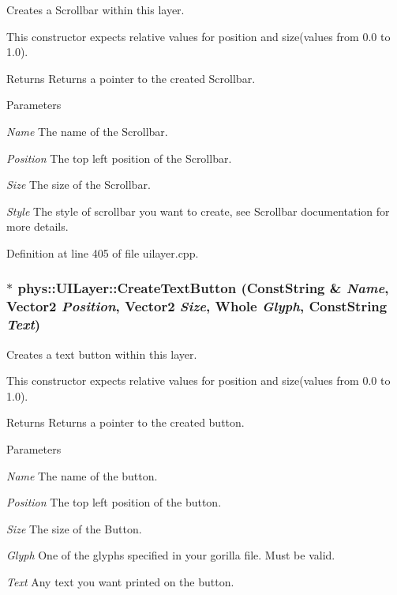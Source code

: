 Creates a Scrollbar within this layer. 

This constructor expects relative values for position and size(values from 0.0 to 1.0). \begin{DoxyReturn}{Returns}
Returns a pointer to the created Scrollbar. 
\end{DoxyReturn}

\begin{DoxyParams}{Parameters}
\item[{\em Name}]The name of the Scrollbar. \item[{\em Position}]The top left position of the Scrollbar. \item[{\em Size}]The size of the Scrollbar. \item[{\em Style}]The style of scrollbar you want to create, see Scrollbar documentation for more details. \end{DoxyParams}


Definition at line 405 of file uilayer.cpp.

\hypertarget{classphys_1_1UILayer_a734a98ef447b774cae7fd386e0624710}{
\subsubsection[{CreateTextButton}]{ $\ast$ phys::UILayer::CreateTextButton ({\bf ConstString} \& {\em Name}, \/  {\bf Vector2} {\em Position}, \/  {\bf Vector2} {\em Size}, \/  {\bf Whole} {\em Glyph}, \/  {\bf ConstString} {\em Text})}}
\label{da/d48/classphys_1_1UILayer_a734a98ef447b774cae7fd386e0624710}


Creates a text button within this layer. 

This constructor expects relative values for position and size(values from 0.0 to 1.0). \begin{DoxyReturn}{Returns}
Returns a pointer to the created button. 
\end{DoxyReturn}

\begin{DoxyParams}{Parameters}
\item[{\em Name}]The name of the button. \item[{\em Position}]The top left position of the button. \item[{\em Size}]The size of the Button. \item[{\em Glyph}]One of the glyphs specified in your gorilla file. Must be valid. \item[{\em Text}]Any text you want printed on the button. \end{DoxyParams}


